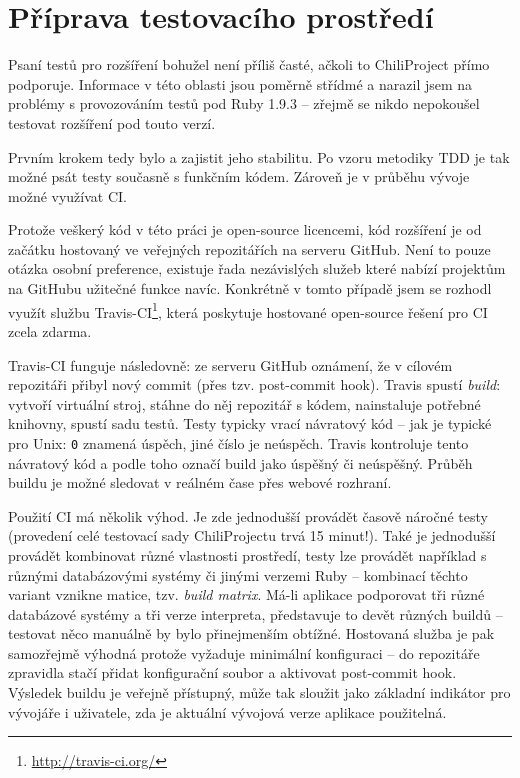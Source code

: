 \documentclass[thesis=B,czech]{FITthesis}[2012/05/02]
\begin{document}
\section{Příprava testovacího prostředí}

Psaní testů pro rozšíření bohužel není příliš časté, ačkoli to
ChiliProject přímo podporuje. Informace v této oblasti jsou poměrně
střídmé a narazil jsem na problémy s provozováním testů pod Ruby 1.9.3
-- zřejmě se nikdo nepokoušel testovat rozšíření pod touto verzí.

Prvním krokem tedy bylo  a zajistit
jeho stabilitu. Po vzoru metodiky \gls{TDD} je tak možné psát testy
současně s funkčním kódem. Zároveň je v průběhu vývoje možné využívat
\gls{CI}.

Protože veškerý kód v této práci je open-source licencemi, kód rozšíření
je od začátku hostovaný ve veřejných repozitářích na serveru GitHub.
Není to pouze otázka osobní preference, existuje řada nezávislých služeb
které nabízí projektům na GitHubu užitečné funkce navíc. Konkrétně v
tomto případě jsem se rozhodl využít službu Travis-CI\footnote{\url{http://travis-ci.org/}},
která poskytuje hostované open-source řešení pro \gls{CI} zcela zdarma.

Travis-CI funguje následovně: ze serveru GitHub oznámení, že v cílovém
repozitáři přibyl nový \gls{commit} (přes tzv. post-commit hook). Travis
spustí \emph{build}: vytvoří virtuální stroj, stáhne do něj repozitář s
kódem, nainstaluje potřebné knihovny, spustí sadu testů. Testy typicky
vrací návratový kód -- jak je typické pro Unix: \lstinline!0! znamená
úspěch, jiné číslo je neúspěch. Travis kontroluje tento návratový kód a
podle toho označí build jako úspěšný či neúspěšný. Průběh buildu je
možné sledovat v reálném čase přes webové rozhraní.

Použití \gls{CI} má několik výhod. Je zde jednodušší provádět časově
náročné testy (provedení celé testovací sady ChiliProjectu trvá 15
minut!). Také je jednodušší provádět kombinovat různé vlastnosti
prostředí, testy lze provádět například s různými databázovými systémy
či jinými verzemi Ruby -- kombinací těchto variant vznikne matice, tzv.
\emph{build matrix}. Má-li aplikace podporovat tři různé databázové systémy
a tři verze interpreta, představuje to devět různých buildů -- testovat
něco manuálně by bylo přinejmenším obtížné. Hostovaná služba je pak
samozřejmě výhodná protože vyžaduje minimální konfiguraci -- do
repozitáře zpravidla stačí přidat konfigurační soubor a aktivovat
post-commit hook. Výsledek buildu je veřejně přístupný, může tak sloužit
jako základní indikátor pro vývojáře i uživatele, zda je aktuální
vývojová verze aplikace použitelná.
\end{document}
